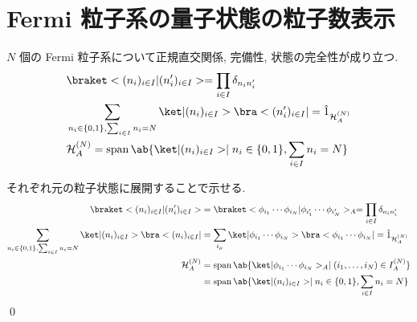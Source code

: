 \documentclass[uplatex,dvipdfmx,a4paper,11pt]{jlreq}
\makeatletter
\DeclareMathOperator{\Span}{span}
\newcommand{\HH}{\mathcal{H}}
\numberwithin{equation}{section}
\theoremstyle{definition}
\renewenvironment{proof}[1][\proofname]{\par
  \normalfont
  \topsep6\p@\@plus6\p@ \trivlist
  \item[\hskip\labelsep{\bfseries #1}\@addpunct{\bfseries}]\ignorespaces\quad\par
}{%
  \qed\endtrivlist\@endpefalse
}
\renewcommand\proofname{証明}
\makeatother
\begin{document}
\section{Fermi 粒子系の量子状態の粒子数表示}
\begin{theorem}
  $N$ 個の Fermi 粒子系について正規直交関係, 完備性, 状態の完全性が成り立つ.
  \begin{align}
     & \braket<(n_i)_{i\in I}|(n_i')_{i\in I}> = \prod_{i\in I}\delta_{n_in_i'}                                      \\
     & \sum_{n_i\in\{0, 1\}, \sum_{i\in I}n_i = N} \ket|(n_i)_{i\in I}>\bra<(n_i')_{i\in I}| = \hat{1}_{\HH_A^{(N)}} \\
     & \HH_A^{(N)} = \Span\ab\{\ket|(n_i)_{i\in I}> \mid n_i\in\{0, 1\}, \sum_{i\in I}n_i = N \}
  \end{align}
  \label{Fermi N character}
\end{theorem}
\begin{proof}
  それぞれ元の粒子状態に展開することで示せる.
  \begin{align}
    \braket<(n_i)_{i\in I}|(n_i')_{i\in I}>                                              & = \braket<\phi_{i_1}\cdots\phi_{i_N}|\phi_{i_1'}\cdots\phi_{i_N'}>_A = \prod_{i\in I}\delta_{n_in_i'}   \\
    \sum_{n_i\in\{0, 1\}, \sum_{i\in I}n_i = N} \ket|(n_i)_{i\in I}>\bra<(n_i)_{i\in I}| & = \sum_{i_\mu} \ket|\phi_{i_1}\cdots\phi_{i_N}>\bra<\phi_{i_1}\cdots\phi_{i_N}| = \hat{1}_{\HH_A^{(N)}} \\
    \HH_A^{(N)}                                                                          & = \Span\ab\{\ket|\phi_{i_1}\cdots\phi_{i_N}>_A \mid (i_1,\ldots,i_N)\in I_A^{(N)} \}                    \\
                                                                                         & = \Span\ab\{\ket|(n_i)_{i\in I}> \mid n_i\in\{0, 1\}, \sum_{i\in I}n_i = N \}
  \end{align}
\end{proof}
\end{document}
